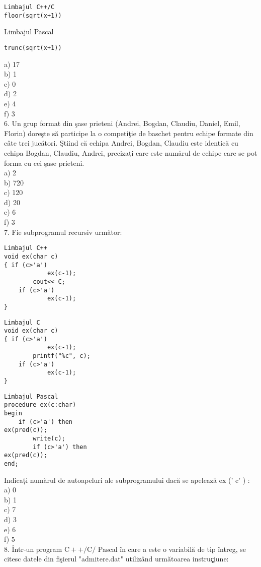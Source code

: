 \begin{verbatim}
Limbajul C++/C
floor(sqrt(x+1))
\end{verbatim}

Limbajul Pascal

\begin{verbatim}
trunc(sqrt(x+1))
\end{verbatim}

a) 17\\
b) 1\\
c) 0\\
d) 2\\
e) 4\\
f) 3\\
6. Un grup format din şase prieteni (Andrei, Bogdan, Claudiu, Daniel, Emil, Florin) doreşte să participe la o competiţie de baschet pentru echipe formate din câte trei jucători. Ştiind că echipa Andrei, Bogdan, Claudiu este identică cu echipa Bogdan, Claudiu, Andrei, precizați care este numărul de echipe care se pot forma cu cei şase prieteni.\\
a) 2\\
b) 720\\
c) 120\\
d) 20\\
e) 6\\
f) 3\\
7. Fie subprogramul recursiv următor:

\begin{verbatim}
Limbajul C++
void ex(char c)
{ if (c>'a')
            ex(c-1);
        cout<< C;
    if (c>'a')
            ex(c-1);
}
\end{verbatim}

\begin{verbatim}
Limbajul C
void ex(char c)
{ if (c>'a')
            ex(c-1);
        printf("%c", c);
    if (c>'a')
            ex(c-1);
}
\end{verbatim}

\begin{verbatim}
Limbajul Pascal
procedure ex(c:char)
begin
    if (c>'a') then
ex(pred(c));
        write(c);
        if (c>'a') then
ex(pred(c));
end;
\end{verbatim}

Indicați numărul de autoapeluri ale subprogramului dacă se apelează ex (' c' ) :\\
a) 0\\
b) 1\\
c) 7\\
d) 3\\
e) 6\\
f) 5\\
8. Într-un program $\mathrm{C}++/ \mathrm{C} /$ Pascal în care a este o variabilă de tip întreg, se citesc datele din fişierul "admitere.dat" utilizând următoarea instruç̧iune:

